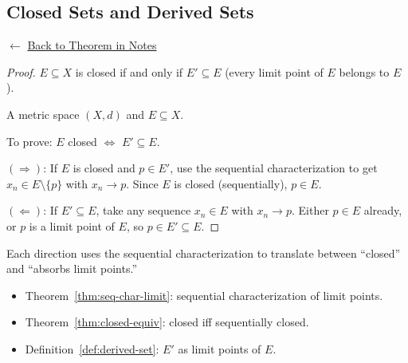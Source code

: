 
\subsection*{Closed Sets and Derived Sets}
\label{prf:closed-derived}

\begin{remark*}[Return]
$\leftarrow$ \hyperref[thm:closed-derived]{Back to Theorem in Notes}
\end{remark*}

\begin{proof}
\Claim $E \subseteq X$ is closed if and only if $E' \subseteq E$
(every limit point of $E$ belongs to $E$).

\Given A metric space $(X,d)$ and $E \subseteq X$.

\Goal To prove: $E$ closed $\iff$ $E' \subseteq E$.

\Strategy
$(\Rightarrow)$: If $E$ is closed and $p \in E'$, use the sequential
characterization to get $x_n \in E \setminus \{p\}$ with $x_n \to p$.
Since $E$ is closed (sequentially), $p \in E$.

$(\Leftarrow)$: If $E' \subseteq E$, take any sequence $x_n \in E$ with
$x_n \to p$. Either $p \in E$ already, or $p$ is a limit point of $E$,
so $p \in E' \subseteq E$.


\end{proof}

\begin{remark*}
Each direction uses the sequential characterization to translate between
``closed'' and ``absorbs limit points.''
\end{remark*}

\begin{remark*}[Dependencies]
\begin{itemize}
  \item Theorem~\ref{thm:seq-char-limit}: sequential characterization of limit points.
  \item Theorem~\ref{thm:closed-equiv}: closed iff sequentially closed.
  \item Definition~\ref{def:derived-set}: $E'$ as limit points of $E$.
\end{itemize}
\end{remark*}
